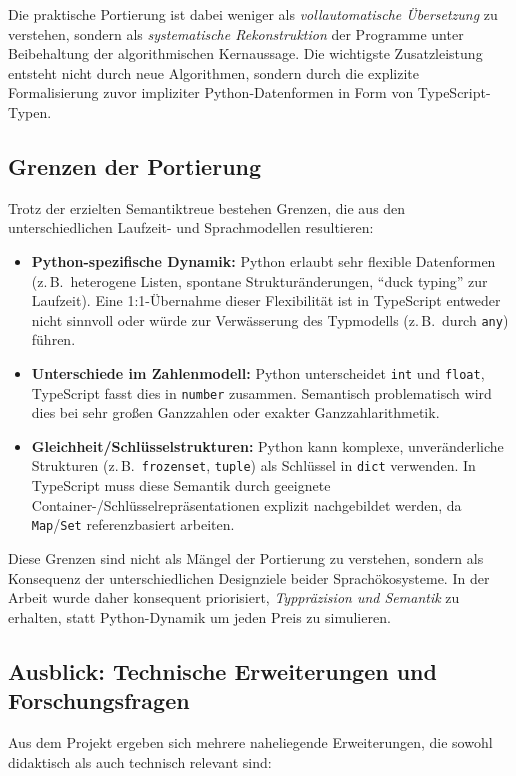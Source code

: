 Die praktische Portierung ist dabei weniger als \emph{vollautomatische Übersetzung} zu verstehen, sondern als \emph{systematische Rekonstruktion} der Programme unter Beibehaltung der algorithmischen Kernaussage. Die wichtigste Zusatzleistung entsteht nicht durch neue Algorithmen, sondern durch die explizite Formalisierung zuvor impliziter Python-Datenformen in Form von TypeScript-Typen.

\subsection{Grenzen der Portierung}
Trotz der erzielten Semantiktreue bestehen Grenzen, die aus den unterschiedlichen Laufzeit- und Sprachmodellen resultieren:

\begin{itemize}
  \item \textbf{Python-spezifische Dynamik:} Python erlaubt sehr flexible Datenformen (z.\,B.\ heterogene Listen, spontane Strukturänderungen, ``duck typing'' zur Laufzeit). Eine 1:1-Übernahme dieser Flexibilität ist in TypeScript entweder nicht sinnvoll oder würde zur Verwässerung des Typmodells (z.\,B.\ durch \texttt{any}) führen. \autocite[S.44ff]{vanderkam2019effective}
  \item \textbf{Unterschiede im Zahlenmodell:} Python unterscheidet \texttt{int} und \texttt{float}, TypeScript fasst dies in \texttt{number} zusammen. Semantisch problematisch wird dies bei sehr großen Ganzzahlen oder exakter Ganzzahlarithmetik.
  \item \textbf{Gleichheit/Schlüsselstrukturen:} Python kann komplexe, unveränderliche Strukturen (z.\,B.\ \texttt{frozenset}, \texttt{tuple}) als Schlüssel in \texttt{dict} verwenden. In TypeScript muss diese Semantik durch geeignete Container-/Schlüsselrepräsentationen explizit nachgebildet werden, da \texttt{Map}/\texttt{Set} referenzbasiert arbeiten.
\end{itemize}

Diese Grenzen sind nicht als Mängel der Portierung zu verstehen, sondern als Konsequenz der unterschiedlichen Designziele beider Sprachökosysteme. In der Arbeit wurde daher konsequent priorisiert, \emph{Typpräzision und Semantik} zu erhalten, statt Python-Dynamik um jeden Preis zu simulieren.

\subsection{Ausblick: Technische Erweiterungen und Forschungsfragen}
Aus dem Projekt ergeben sich mehrere naheliegende Erweiterungen, die sowohl didaktisch als auch technisch relevant sind:

